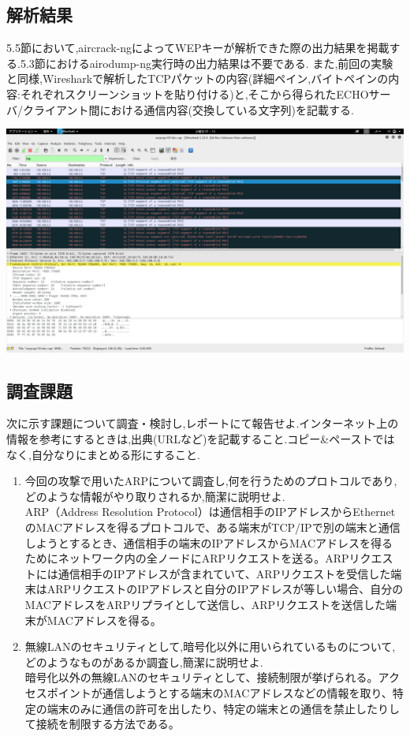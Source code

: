 \documentclass[a4j]{celb-report}
\begin{document}
\subsection{解析結果}
5.5節において,aircrack-ngによってWEPキーが解析できた際の出力結果を掲載する.5.3節におけるairodump-ng実行時の出力結果は不要である.
また,前回の実験と同様,Wiresharkで解析したTCPパケットの内容(詳細ペイン,バイトペインの内容:それぞれスクリーンショットを貼り付ける)と,そこから得られたECHOサーバ/クライアント間における通信内容(交換している文字列)を記載する.

\begin{center}
 \includegraphics[width=17cm]{../LAN2/screenshot.png}
\end{center}
\subsection{調査課題}
次に示す課題について調査・検討し,レポートにて報告せよ.インターネット上の情報を参考にするときは,出典(URLなど)を記載すること.コピー\&ペーストではなく,自分なりにまとめる形にすること.
\begin{enumerate}
 \renewcommand{\labelenumi}{(\arabic{enumi})}
 \item 今回の攻撃で用いたARPについて調査し,何を行うためのプロトコルであり,どのような情報がやり取りされるか,簡潔に説明せよ.\\
\quad ARP（Address Resolution Protocol）は通信相手のIPアドレスからEthernetのMACアドレスを得るプロトコルで、ある端末がTCP/IPで別の端末と通信しようとするとき、通信相手の端末のIPアドレスからMACアドレスを得るためにネットワーク内の全ノードにARPリクエストを送る。ARPリクエストには通信相手のIPアドレスが含まれていて、ARPリクエストを受信した端末はARPリクエストのIPアドレスと自分のIPアドレスが等しい場合、自分のMACアドレスをARPリプライとして送信し、ARPリクエストを送信した端末がMACアドレスを得る。
 \item 無線LANのセキュリティとして,暗号化以外に用いられているものについて,どのようなものがあるか調査し,簡潔に説明せよ.\\
\quad 暗号化以外の無線LANのセキュリティとして、接続制限が挙げられる。アクセスポイントが通信しようとする端末のMACアドレスなどの情報を取り、特定の端末のみに通信の許可を出したり、特定の端末との通信を禁止したりして接続を制限する方法である。
\end{enumerate}
\newpage
\end{document}
